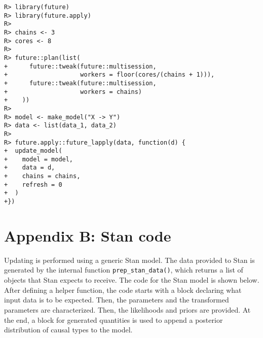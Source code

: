 \documentclass[
  11pt,
  article]{jss}
\begin{document}
\begin{verbatim}
R> library(future)
R> library(future.apply)
R> 
R> chains <- 3
R> cores <- 8
R> 
R> future::plan(list(
+      future::tweak(future::multisession, 
+                    workers = floor(cores/(chains + 1))),
+      future::tweak(future::multisession, 
+                    workers = chains)
+    ))
R> 
R> model <- make_model("X -> Y")
R> data <- list(data_1, data_2)
R> 
R> future.apply::future_lapply(data, function(d) {
+  update_model(
+    model = model,
+    data = d,
+    chains = chains,
+    refresh = 0
+  )
+})
\end{verbatim}

\hypertarget{sec-stancode}{%
\section*{Appendix B: Stan code}\label{sec-stancode}}

Updating is performed using a generic Stan model. The data provided to
Stan is generated by the internal function \texttt{prep\_stan\_data()},
which returns a list of objects that Stan expects to receive. The code
for the Stan model is shown below. After defining a helper function, the
code starts with a block declaring what input data is to be expected.
Then, the parameters and the transformed parameters are characterized.
Then, the likelihoods and priors are provided. At the end, a block for
generated quantities is used to append a posterior distribution of
causal types to the model.
\end{document}
